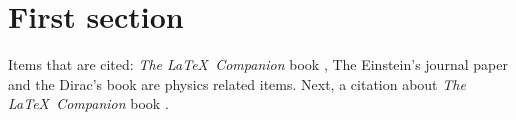 \documentclass{article}
\begin{document}
\section{First section}

Items that are cited: \textit{The \LaTeX\ Companion} book \cite{latexcompanion}, The Einstein's journal paper \cite{einstein} and the Dirac's book \cite{dirac} are physics related items. Next, a citation about \textit{The \LaTeX\ Companion} book \cite{latexcompanion}.

\medskip

\printbibliography
\end{document}
